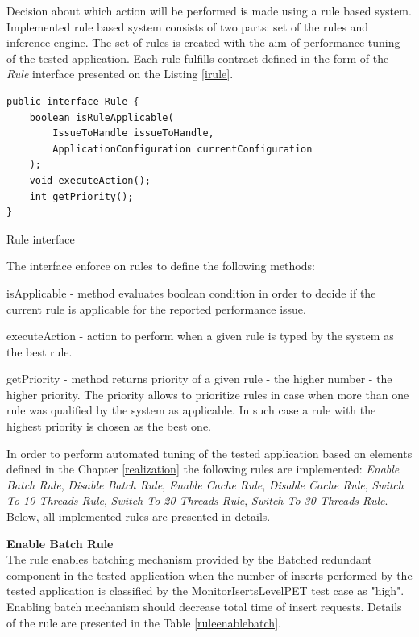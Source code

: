 \documentclass[12pt,a4paper]{article}
\let\tempone\itemize
\let\temptwo\enditemize
\renewenvironment{itemize}{\tempone\addtolength{\itemsep}{-0.4\baselineskip}}{\temptwo}
\begin{document}
Decision about which action will be performed is made using a rule based system. Implemented rule based system  consists of two parts: set of the rules and inference engine. The set of rules is created with the aim of performance tuning of the tested application. Each rule fulfills contract defined in the form of the \textit{Rule} interface presented on the Listing \ref{irule}.

\begin{listing}[ht]\begin{verbatim}
public interface Rule {
    boolean isRuleApplicable(
    	IssueToHandle issueToHandle, 
    	ApplicationConfiguration currentConfiguration
    );
    void executeAction();
    int getPriority();
}
\end{verbatim}
\caption{Rule interface} \label{irule}
\end{listing}

The interface enforce on rules to define the following methods: 
\begin{itemize}
\item isApplicable - method evaluates boolean condition in order to decide if the current rule is applicable for the reported performance issue.   
\item executeAction - action to perform when a given rule is typed by the system as the best rule.   
\item getPriority - method returns priority of a given rule - the higher number - the higher priority. The priority allows to prioritize rules in case when more than one rule was qualified by the system as applicable. In such case a rule with the highest priority is chosen as the best one. 
\end{itemize}

In order to perform automated tuning of the tested application based on elements defined in the Chapter \ref{realization} the following rules are implemented: \textit{Enable Batch Rule}, \textit{Disable Batch Rule}, \textit{Enable Cache Rule}, \textit{Disable Cache Rule}, \textit{Switch To 10 Threads Rule}, \textit{Switch To 20 Threads Rule}, \textit{Switch To 30 Threads Rule}. Below, all implemented rules are presented in details.  

\vspace{5mm}

\noindent\textbf{Enable Batch Rule} \\
The rule enables batching mechanism provided by the Batched redundant component in the tested application when the number of  inserts performed by the tested application is classified by the MonitorIsertsLevelPET test case as "high". Enabling batch mechanism should decrease total time of insert requests. Details of the rule are presented in the Table \ref{ruleenablebatch}.
\end{document}
